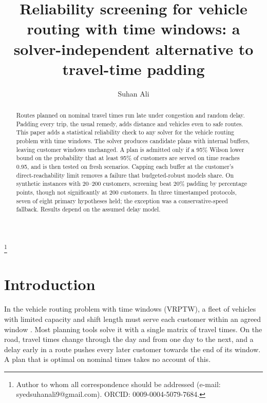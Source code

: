 \documentclass{itor}
\begin{document}
\title{Reliability screening for vehicle routing with time windows: a
solver-independent alternative to travel-time padding}

\author[S. Ali]{Suhan Ali}
\thanks{\affmark{$\ast$}Author to whom all correspondence should be addressed
(e-mail: syedsuhanali9@gmail.com). ORCID: \mbox{0009-0004-5079-7684}.}


\begin{abstract}
Routes planned on nominal travel times run late under congestion and random
delay. Padding every trip, the usual remedy, adds distance and vehicles even to
safe routes. This paper adds a statistical reliability check to
any solver for the vehicle routing problem with time windows. The solver produces candidate plans with internal buffers,
leaving customer windows unchanged. A plan is admitted only if a 95\% Wilson lower
bound on the probability that at least 95\% of customers are served on time
reaches 0.95, and is then tested on fresh scenarios. Capping each buffer at the
customer's direct-reachability limit removes a failure that budgeted-robust
models share. On synthetic instances with 20--200 customers, screening beat 20\%
padding by \ProcConsRange{} percentage points, though not significantly at 200
customers. In three timestamped protocols, seven of eight primary hypotheses
held; the exception was a conservative-speed fallback. Results depend on
the assumed delay model.
\end{abstract}


\maketitle

\section{Introduction}

In the vehicle routing problem with time windows (VRPTW), a fleet of vehicles
with limited capacity and shift length must serve each customer within an
agreed window \citep{solomon1987,toth2014}. Most planning tools solve it with a
single matrix of travel times. On the road, travel times change through the day
and from one day to the next, and a delay early in a route pushes every later
customer towards the end of its window. A plan that is optimal on nominal times
takes no account of this.
\end{document}
